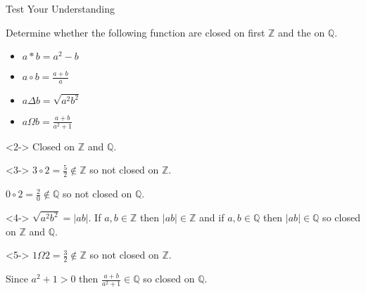 \documentclass[8pt]{beamer}
\newcommand{\Q}{\mathbb{Q}}
\newcommand{\Z}{\mathbb{Z}}
\begin{document}
\begin{frame}{Test Your Understanding}
	\begin{problem}
	Determine whether the following function are closed on first $ \mathbb{Z}$ and the on $\mathbb{Q}.$
\begin{itemize}
	\item $a*b=a^2-b$
	\item $a \circ b = \frac{a+b}{a}$
	\item $a\Delta b= \sqrt{a^2b^2} $
	\item $a\Omega b=\frac{a+b}{a^2+1}$
\end{itemize}
 \end{problem}
	
 \begin{solution}<2->
Closed on $\Z$ and $\Q$.
 \end{solution}

 \begin{solution}<3->
 	$3\circ 2=\frac{5}{2}\not\in \Z$ so not closed on $\Z$.

	$0\circ 2=\frac{2}{0}\not\in \Q$ so not closed on $\Q$.

 \end{solution}

\begin{solution}<4->
	$\sqrt{a^2b^2}=|ab| .$ If $a,b \in \Z$ then $|ab|\in \Z$ and if $a,b \in \Q$ then $|ab| \in \Q$ so closed on $\Z$ and $\Q$. 
\end{solution}

\begin{solution}<5->
	$1\Omega 2=\frac{3}{2}\not\in \Z$ so not closed on $\Z$.

	Since $a^2+1>0$ then $\frac{a+b}{a^2+1}\in \Q$ so closed on $\Q$.
\end{solution}
\end{frame}
\end{document}
